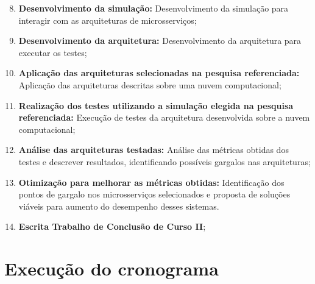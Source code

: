 \begin{enumerate}
  \setcounter{enumi}{7}
  \item \textbf{Desenvolvimento da simulação:} Desenvolvimento da simulação para interagir com as arquiteturas de microsserviços;

  \item \textbf{Desenvolvimento da arquitetura:} Desenvolvimento da arquitetura para executar os testes;

  \item \textbf{Aplicação das arquiteturas selecionadas na pesquisa referenciada:} Aplicação das arquiteturas descritas sobre uma nuvem computacional;

  \item \textbf{Realização dos testes utilizando a simulação elegida na pesquisa referenciada:} Execução de testes da arquitetura desenvolvida sobre a nuvem computacional;

  \item \textbf{Análise das arquiteturas testadas:} Análise das métricas obtidas dos testes e descrever resultados, identificando possíveis gargalos nas arquiteturas;

  \item \textbf{Otimização para melhorar as métricas obtidas:} Identificação dos pontos de gargalo nos microsserviços selecionados e proposta de soluções viáveis para aumento do desempenho desses sistemas.

  \item \textbf{Escrita Trabalho de Conclusão de Curso II};
\end{enumerate}



\section{Execução do cronograma}

